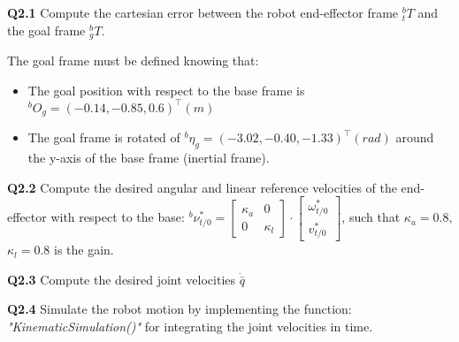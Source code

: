 \textbf{Q2.1} Compute the cartesian error between the robot end-effector frame $^b_t T$ and the goal frame $^b_{g} T$.

The goal frame  must be defined knowing that:
\begin{itemize}
    \item The goal position with respect to the base frame is $^b O_g = (-0.14, -0.85, 0.6)^\top(m)$
    \item The goal frame is rotated of $^b \eta_{g} = (-3.02, -0.40, -1.33)^\top(rad)$ around the y-axis of the base frame (inertial frame).
\end{itemize}

\textbf{Q2.2}
Compute the desired angular and linear reference velocities of the end-effector  with respect to the base: $^b \nu^*_{t/0} = \begin{bmatrix}
    \kappa_a &0\\
    0 &\kappa_l
\end{bmatrix}\cdot \begin{bmatrix} \omega^*_{t/0} \\  v^*_{t/0} \end{bmatrix}$, such that $\kappa_{a} = 0.8$,$\kappa_{l} = 0.8$ is the gain.
    
\textbf{Q2.3}
Compute the desired joint velocities $\dot{\bar{q}}$

\textbf{Q2.4}
Simulate the robot motion by implementing the function: \textit{"KinematicSimulation()"} for integrating the joint velocities in time.